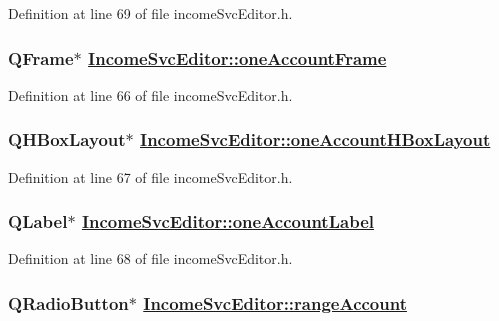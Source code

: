 Definition at line 69 of file income\-Svc\-Editor.h.\hypertarget{classIncomeSvcEditor_r9}{
\subsubsection[oneAccountFrame]{\setlength{\rightskip}{0pt plus 5cm}QFrame$\ast$ \hyperlink{classIncomeSvcEditor_r9}{Income\-Svc\-Editor::one\-Account\-Frame}}}
\label{classIncomeSvcEditor_r9}


Definition at line 66 of file income\-Svc\-Editor.h.\hypertarget{classIncomeSvcEditor_r10}{
\subsubsection[oneAccountHBoxLayout]{\setlength{\rightskip}{0pt plus 5cm}QHBox\-Layout$\ast$ \hyperlink{classIncomeSvcEditor_r10}{Income\-Svc\-Editor::one\-Account\-HBox\-Layout}}}
\label{classIncomeSvcEditor_r10}


Definition at line 67 of file income\-Svc\-Editor.h.\hypertarget{classIncomeSvcEditor_r11}{
\subsubsection[oneAccountLabel]{\setlength{\rightskip}{0pt plus 5cm}QLabel$\ast$ \hyperlink{classIncomeSvcEditor_r11}{Income\-Svc\-Editor::one\-Account\-Label}}}
\label{classIncomeSvcEditor_r11}


Definition at line 68 of file income\-Svc\-Editor.h.\hypertarget{classIncomeSvcEditor_r13}{
\subsubsection[rangeAccount]{\setlength{\rightskip}{0pt plus 5cm}QRadio\-Button$\ast$ \hyperlink{classIncomeSvcEditor_r13}{Income\-Svc\-Editor::range\-Account}}}
\label{classIncomeSvcEditor_r13}



